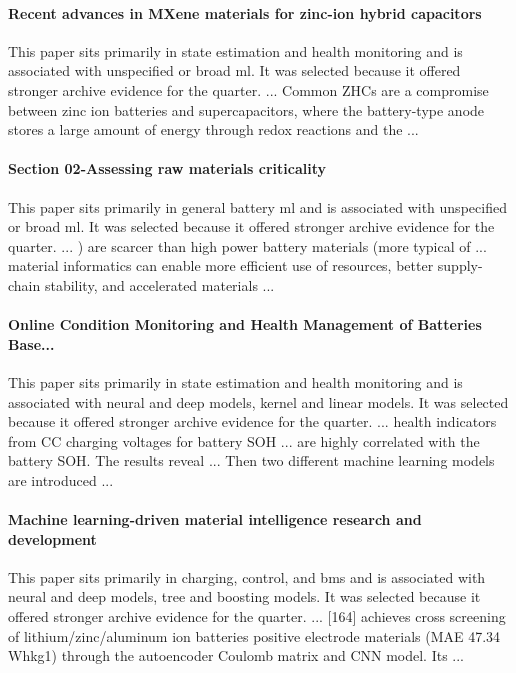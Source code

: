 \documentclass[conference]{IEEEtran}
\begin{document}
\paragraph{Recent advances in MXene materials for zinc-ion hybrid capacitors} This paper sits primarily in state estimation and health monitoring and is associated with unspecified or broad ml. It was selected because it offered stronger archive evidence for the quarter. ... Common ZHCs are a compromise between zinc ion batteries and supercapacitors, where the battery-type anode stores a large amount of energy through redox reactions and the ... \cite{recentadvancesin2025}

\paragraph{Section 02-Assessing raw materials criticality} This paper sits primarily in general battery ml and is associated with unspecified or broad ml. It was selected because it offered stronger archive evidence for the quarter. ... ) are scarcer than high power battery materials (more typical of ... material informatics can enable more efficient use of resources, better supply-chain stability, and accelerated materials ... \cite{section02assessingna}

\paragraph{Online Condition Monitoring and Health Management of Batteries Base...} This paper sits primarily in state estimation and health monitoring and is associated with neural and deep models, kernel and linear models. It was selected because it offered stronger archive evidence for the quarter. ... health indicators from CC charging voltages for battery SOH ... are highly correlated with the battery SOH. The results reveal ... Then two different machine learning models are introduced ... \cite{onlineconditionmonitorin2022}

\paragraph{Machine learning-driven material intelligence research and development} This paper sits primarily in charging, control, and bms and is associated with neural and deep models, tree and boosting models. It was selected because it offered stronger archive evidence for the quarter. ... [164] achieves cross screening of lithium/zinc/aluminum ion batteries positive electrode materials (MAE 47.34 Whkg1) through the autoencoder Coulomb matrix and CNN model. Its ... \cite{machinelearningdriven2025}
\end{document}
